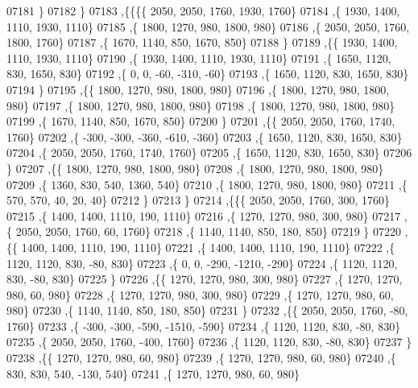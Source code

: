 \begin{DoxyCode}
07181    \}
07182   \}
07183  ,\{\{\{\{  2050,  2050,  1760,  1930,  1760\}
07184     ,\{  1930,  1400,  1110,  1930,  1110\}
07185     ,\{  1800,  1270,   980,  1800,   980\}
07186     ,\{  2050,  2050,  1760,  1800,  1760\}
07187     ,\{  1670,  1140,   850,  1670,   850\}
07188     \}
07189    ,\{\{  1930,  1400,  1110,  1930,  1110\}
07190     ,\{  1930,  1400,  1110,  1930,  1110\}
07191     ,\{  1650,  1120,   830,  1650,   830\}
07192     ,\{     0,     0,   -60,  -310,   -60\}
07193     ,\{  1650,  1120,   830,  1650,   830\}
07194     \}
07195    ,\{\{  1800,  1270,   980,  1800,   980\}
07196     ,\{  1800,  1270,   980,  1800,   980\}
07197     ,\{  1800,  1270,   980,  1800,   980\}
07198     ,\{  1800,  1270,   980,  1800,   980\}
07199     ,\{  1670,  1140,   850,  1670,   850\}
07200     \}
07201    ,\{\{  2050,  2050,  1760,  1740,  1760\}
07202     ,\{  -300,  -300,  -360,  -610,  -360\}
07203     ,\{  1650,  1120,   830,  1650,   830\}
07204     ,\{  2050,  2050,  1760,  1740,  1760\}
07205     ,\{  1650,  1120,   830,  1650,   830\}
07206     \}
07207    ,\{\{  1800,  1270,   980,  1800,   980\}
07208     ,\{  1800,  1270,   980,  1800,   980\}
07209     ,\{  1360,   830,   540,  1360,   540\}
07210     ,\{  1800,  1270,   980,  1800,   980\}
07211     ,\{   570,   570,    40,    20,    40\}
07212     \}
07213    \}
07214   ,\{\{\{  2050,  2050,  1760,   300,  1760\}
07215     ,\{  1400,  1400,  1110,   190,  1110\}
07216     ,\{  1270,  1270,   980,   300,   980\}
07217     ,\{  2050,  2050,  1760,    60,  1760\}
07218     ,\{  1140,  1140,   850,   180,   850\}
07219     \}
07220    ,\{\{  1400,  1400,  1110,   190,  1110\}
07221     ,\{  1400,  1400,  1110,   190,  1110\}
07222     ,\{  1120,  1120,   830,   -80,   830\}
07223     ,\{     0,     0,  -290, -1210,  -290\}
07224     ,\{  1120,  1120,   830,   -80,   830\}
07225     \}
07226    ,\{\{  1270,  1270,   980,   300,   980\}
07227     ,\{  1270,  1270,   980,    60,   980\}
07228     ,\{  1270,  1270,   980,   300,   980\}
07229     ,\{  1270,  1270,   980,    60,   980\}
07230     ,\{  1140,  1140,   850,   180,   850\}
07231     \}
07232    ,\{\{  2050,  2050,  1760,   -80,  1760\}
07233     ,\{  -300,  -300,  -590, -1510,  -590\}
07234     ,\{  1120,  1120,   830,   -80,   830\}
07235     ,\{  2050,  2050,  1760,  -400,  1760\}
07236     ,\{  1120,  1120,   830,   -80,   830\}
07237     \}
07238    ,\{\{  1270,  1270,   980,    60,   980\}
07239     ,\{  1270,  1270,   980,    60,   980\}
07240     ,\{   830,   830,   540,  -130,   540\}
07241     ,\{  1270,  1270,   980,    60,   980\}

\end{DoxyCode}
